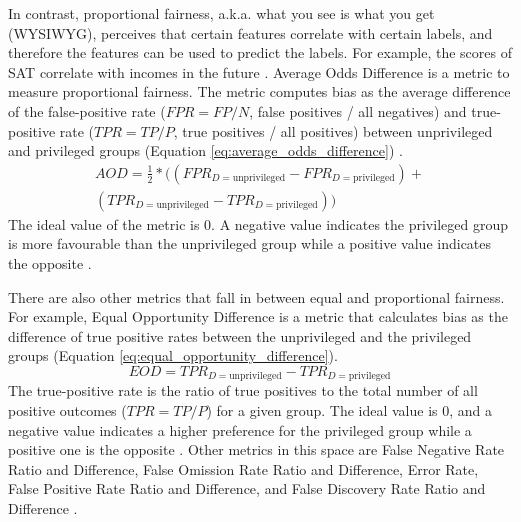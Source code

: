 \documentclass[sigconf]{acmart}
\begin{document}
	In contrast, proportional fairness, a.k.a. what you see is what you get (WYSIWYG),  perceives that certain features correlate with certain labels, and therefore the features can be used to predict the labels. For example, the scores of SAT correlate with incomes in the future \cite{mahoney2020ai,ibmaif3602022guidance}. Average Odds Difference is a metric to measure proportional fairness. The metric computes bias as the average difference of the false-positive rate ($FPR = FP/N$, false positives / all negatives) and true-positive rate ($TPR = TP/P$, true positives / all positives) between unprivileged and privileged groups (Equation \ref{eq:average_odds_difference}) \cite{ibmaif3602022doc,bellamy2018ai}.
	\begin{equation} \label{eq:average_odds_difference}
		\begin{aligned}
			AOD = \tfrac{1}{2}* ((FPR_{D = \text{unprivileged}} - FPR_{D = \text{privileged}}) +\\
			(TPR_{D = \text{unprivileged}} - TPR_{D = \text{privileged}}))
		\end{aligned}
	\end{equation}
	The ideal value of the metric is 0. A negative value indicates the privileged group is more favourable than the unprivileged group while a positive value indicates the opposite \cite{ibmaif3602022doc,bellamy2018ai}. 
	
	There are also other metrics that fall in between equal and proportional fairness. For example, Equal Opportunity Difference \cite{ibmaif3602022doc,bellamy2018ai} is a metric that calculates bias as the difference of true positive rates between the unprivileged and the privileged groups (Equation \ref{eq:equal_opportunity_difference}). 
	\begin{equation} \label{eq:equal_opportunity_difference}
		EOD = TPR_{D = \text{unprivileged}} - TPR_{D = \text{privileged}}	
	\end{equation}
	The true-positive rate is the ratio of true positives to the total number of all positive outcomes ($TPR=TP/P$) for a given group. The ideal value is 0, and a negative value indicates a higher preference for the privileged group while a positive one is the opposite \cite{ibmaif3602022doc,bellamy2018ai}. Other metrics in this space are False Negative Rate Ratio and Difference, False Omission Rate Ratio and Difference, Error Rate, False Positive Rate Ratio and Difference, and False Discovery Rate Ratio and Difference \cite{mahoney2020ai,ibmaif3602022guidance}.
	
\end{document}
